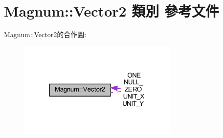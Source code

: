 \hypertarget{class_magnum_1_1_vector2}{}\section{Magnum\+:\+:Vector2 類別 參考文件}
\label{class_magnum_1_1_vector2}


Magnum\+:\+:Vector2的合作圖\+:\nopagebreak
\begin{figure}[H]
\begin{center}
\leavevmode
\includegraphics[width=226pt]{class_magnum_1_1_vector2__coll__graph}
\end{center}
\end{figure}
